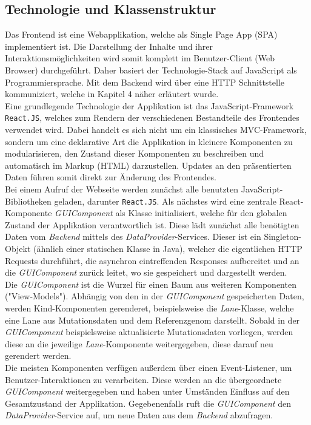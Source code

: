 \subsection{Technologie und Klassenstruktur}
Das Frontend ist eine Webapplikation, welche als Single Page App (SPA) implementiert ist. Die Darstellung der Inhalte und ihrer Interaktionsmöglichkeiten wird somit komplett im Benutzer-Client (Web Browser) durchgeführt. Daher basiert der Technologie-Stack auf JavaScript als Programmiersprache. Mit dem Backend wird über eine HTTP Schnittstelle kommuniziert, welche in Kapitel 4 näher erläutert wurde.\\
Eine grundlegende Technologie der Applikation ist das JavaScript-Framework \texttt{React.JS}, welches zum Rendern der verschiedenen Bestandteile des Frontendes verwendet wird. Dabei handelt es sich nicht um ein klassisches MVC-Framework, sondern um eine deklarative Art die Applikation in kleinere Komponenten zu modularisieren, den Zustand dieser Komponenten zu beschreiben und automatisch im Markup (HTML) darzustellen. Updates an den präsentierten Daten führen somit direkt zur Änderung des Frontendes.\\
Bei einem Aufruf der Webseite werden zunächst alle benutzten JavaScript-Bibliotheken geladen, darunter \texttt{React.JS}. Als nächstes wird eine zentrale React-Komponente \textit{GUIComponent} als Klasse initialisiert, welche für den globalen Zustand der Applikation verantwortlich ist. Diese lädt zunächst alle benötigten Daten vom \textit{Backend} mittels des \textit{DataProvider}-Services. Dieser ist ein Singleton-Objekt (ähnlich einer statischen Klasse in Java), welcher die eigentlichen HTTP Requests durchführt, die asynchron eintreffenden Responses aufbereitet und an die \textit{GUIComponent} zurück leitet, wo sie gespeichert und dargestellt werden.\\
Die \textit{GUIComponent} ist die Wurzel für einen Baum aus weiteren Komponenten ("View-Models"). Abhängig von den in der \textit{GUIComponent} gespeicherten Daten, werden Kind-Komponenten gerenderet, beispielsweise die \textit{Lane}-Klasse, welche eine Lane aus Mutationsdaten und dem Referenzgenom darstellt. Sobald in der \textit{GUIComponent} beispielsweise aktualisierte Mutationsdaten vorliegen, werden diese an die jeweilige \textit{Lane}-Komponente weitergegeben, diese darauf neu gerendert werden.\\
Die meisten Komponenten verfügen außerdem über einen Event-Listener, um Benutzer-Interaktionen zu verarbeiten. Diese werden an die übergeordnete \textit{GUIComponent} weitergegeben und haben unter Umständen Einfluss auf den Gesamtzustand der Applikation. Gegebenenfalls ruft die \textit{GUIComponent} den \textit{DataProvider}-Service auf, um neue Daten aus dem \textit{Backend} abzufragen.\\

